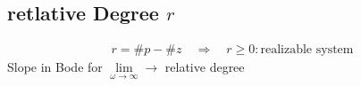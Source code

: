 \subsection{retlative Degree $r$}
    \begin{align*}
        r = \# p - \# z \quad \Rightarrow \quad r \geq 0: \text{realizable system}
    \end{align*}
    Slope in Bode for $\lim\limits_{\omega \rightarrow \infty} \rightarrow$ relative degree
